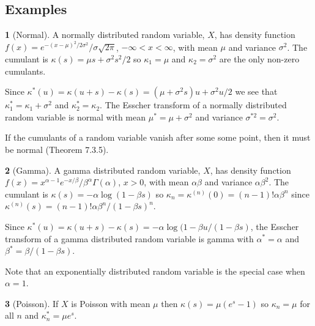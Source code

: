 \documentclass[12pt]{article}
\theoremstyle{definition}
\newtheorem*{example}{}
\begin{document}
\subsection{Examples}
\begin{example}[Normal]
A normally distributed random variable, \(X\), has density function 
\(f(x) = e^{-(x - \mu)^2/2\sigma^2}/\sigma\sqrt{2\pi}\), \(-\infty<x<\infty\),
with mean \(\mu\) and variance \(\sigma^2\).
The cumulant is \(\kappa(s) = \mu s + \sigma^2s^2/2\) so
\(\kappa_1 = \mu\) and \(\kappa_2 = \sigma^2\) are the only non-zero
cumulants. 

Since \(\kappa^*(u) = \kappa(u + s) - \kappa(s) = (\mu + \sigma^2s)u + \sigma^2u/2\)
we see that \(\kappa^*_1 = \kappa_1 + \sigma^2\) and \(\kappa^*_2 = \kappa_2\). The
Esscher transform of a normally distributed random variable is normal
with mean \(\mu^* = \mu + \sigma^2\) and variance \(\sigma^{*2} = \sigma^2\).

If the cumulants of a random variable vanish after some some point, then it must
be normal\cite{Luk1970} (Theorem 7.3.5). \end{example}

\begin{example}[Gamma]
A gamma distributed random variable, \(X\), has density function
\(f(x) = x^{\alpha - 1} e^{-x/\beta}/\beta^\alpha\Gamma(\alpha)\), \(x > 0\),
with mean \(\alpha\beta\) and variance \(\alpha\beta^2\).
The cumulant is \(\kappa(s) = -\alpha\log(1 - \beta s)\) so
\(\kappa_n = \kappa^{(n)}(0) = (n-1)!\alpha\beta^n\) since
\(\kappa^{(n)}(s) = (n-1)!\alpha\beta^n/(1 - \beta s)^n\).

Since \(\kappa^*(u) = \kappa(u + s) - \kappa(s) = -\alpha\log (1 - \beta u/(1 - \beta s)\),
the Esscher transform of a gamma distributed random variable is gamma
with \(\alpha^* = \alpha\) and \(\beta^* = \beta/(1 - \beta s)\).

Note that an exponentially distributed random variable is the special case when 
\(\alpha = 1\).
\end{example}

\begin{example}[Poisson]
If \(X\) is Poisson
with mean \(\mu\) then \(\kappa(s) = \mu(e^s - 1)\) so
\(\kappa_n = \mu\) for all \(n\) and
\(\kappa_n^* = \mu e^s\).
\end{example}
\end{document}
